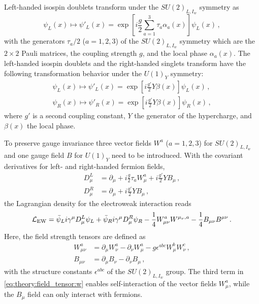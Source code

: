 Left-handed isospin doublets transform under the $SU{(2)}_{L,I_w}$ symmetry as
\begin{equation}
    \psi_L(x) \mapsto \psi'_L(x) = \exp \left[ i \frac{g}{2} \sum_{a=1}^{3} \tau_a \alpha_a(x) \right] \psi_L(x) \,,
\end{equation}
with the generators $\tau_a/2$ ($a = 1, 2, 3$) of the $SU{(2)}_{L,I_w}$ symmetry which are the $2\times 2$ Pauli matrices,
the coupling strength $g$, and the local phase $\alpha_a(x)$.
The left-handed isospin doublets and the right-handed singlets transform have the following transformation behavior under the $U{(1)}_Y$ symmetry:
\begin{gather}
    \psi_L(x) \mapsto \psi'_L(x) = \exp \left[ i \frac{g'}{2} Y \beta(x) \right] \psi_L(x) \,, \\
    \psi_R(x) \mapsto \psi'_R(x) = \exp \left[ i \frac{g'}{2} Y \beta(x) \right] \psi_R(x) \,,
\end{gather}
where $g'$ is a second coupling constant, $Y$ the generator of the hypercharge, and $\beta(x)$ the local phase.

To preserve gauge invariance three vector fields $W^a$ ($a = 1,2,3$) for $SU{(2)}_{L,I_w}$ and one gauge field $B$
for $U{(1)}_Y$ need to be introduced.
With the covariant derivatives for left- and right-handed fermion fields,
\begin{align}
    \label{eq:theory:ew:D}
    D_\mu^L &= \partial_\mu + i \frac{g}{2} \tau_a W_\mu^a + i \frac{g'}{2} Y B_\mu \,, \\
    D_\mu^R &= \partial_\mu + i \frac{g'}{2} Y B_\mu \,,
\end{align}
the Lagrangian density for the electroweak interaction reads
\begin{equation}
    \label{eq:theory:ew:l}
    \mathcal{L}_\text{EW} = \bar{\psi}_L i \gamma^\mu D_\mu^L \psi_L + \bar{\psi}_R i \gamma^\mu D_\mu^R \psi_R - \frac{1}{4} W_{\mu\nu}^a W^{\mu_\nu,a} - \frac{1}{4} B_{\mu\nu} B^{\mu\nu}\,.
\end{equation}
Here, the field strength tensors are defined as
\begin{align}
    \label{eq:theory:field_tensor:w}
    W_{\mu\nu}^a &= \partial_\mu W_\nu^a - \partial_\nu W_\mu^a - g \epsilon^{abc} W_\mu^b W_\nu^c \,, \\
    B_{\mu\nu}   &= \partial_\mu B_\nu - \partial_\nu B_\mu \,,
\end{align}
with the structure constants $\epsilon^{abc}$ of the $SU{(2)}_{L,I_w}$ group.
The third term in \cref{eq:theory:field_tensor:w} enables self-interaction of the vector fields $W^a_\mu$, while the $B_\mu$ field
can only interact with fermions.

